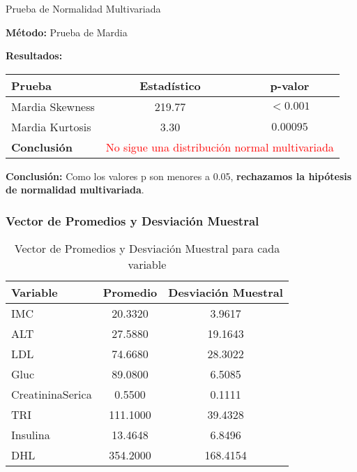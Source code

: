 \documentclass[
	11pt, %
]{beamer}
\begin{document}


\begin{frame}{Prueba de Normalidad Multivariada}

    \textbf{Método:} Prueba de Mardia  

    \textbf{Resultados:}  
    \begin{table}[]
        \centering
        \begin{tabular}{lcc}
            \toprule
            \textbf{Prueba} & \textbf{Estadístico} & \textbf{p-valor} \\
            \midrule
            Mardia Skewness & 219.77 & $< 0.001$ \\
            Mardia Kurtosis & 3.30 & $0.00095$ \\
            \midrule
            \textbf{Conclusión} & \multicolumn{2}{c}{\textcolor{red}{No sigue una distribución normal multivariada}} \\
            \bottomrule
        \end{tabular}
    \end{table}

    \bigskip
    \textbf{Conclusión:}  
    Como los valores p son menores a 0.05, \textbf{rechazamos la hipótesis de normalidad multivariada}.  
    
\end{frame}



\begin{frame}
  \frametitle{Vector de Promedios y Desviación Muestral}

  \begin{table}[ht]
    \centering
    \begin{tabular}{|l|c|c|}
      \hline
      \textbf{Variable} & \textbf{Promedio} & \textbf{Desviación Muestral} \\
      \hline
      IMC & 20.3320 & 3.9617 \\
      ALT & 27.5880 & 19.1643 \\
      LDL & 74.6680 & 28.3022 \\
      Gluc & 89.0800 & 6.5085 \\
      CreatininaSerica & 0.5500 & 0.1111 \\
      TRI & 111.1000 & 39.4328 \\
      Insulina & 13.4648 & 6.8496 \\
      DHL & 354.2000 & 168.4154 \\
      \hline
    \end{tabular}
    \caption{Vector de Promedios y Desviación Muestral para cada variable}
  \end{table}

\end{frame}
\end{document}
